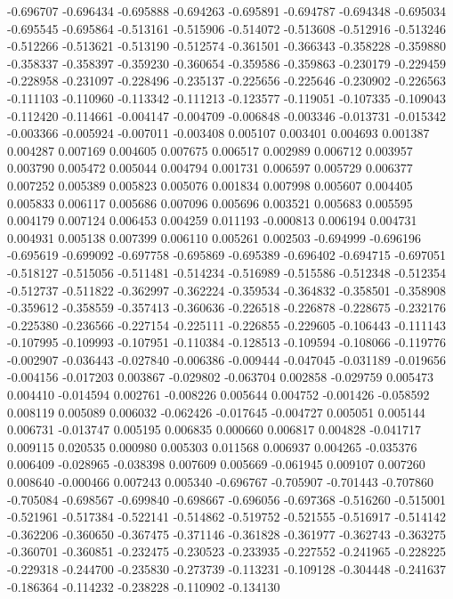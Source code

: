 -0.696707
-0.696434
-0.695888
-0.694263
-0.695891
-0.694787
-0.694348
-0.695034
-0.695545
-0.695864
-0.513161
-0.515906
-0.514072
-0.513608
-0.512916
-0.513246
-0.512266
-0.513621
-0.513190
-0.512574
-0.361501
-0.366343
-0.358228
-0.359880
-0.358337
-0.358397
-0.359230
-0.360654
-0.359586
-0.359863
-0.230179
-0.229459
-0.228958
-0.231097
-0.228496
-0.235137
-0.225656
-0.225646
-0.230902
-0.226563
-0.111103
-0.110960
-0.113342
-0.111213
-0.123577
-0.119051
-0.107335
-0.109043
-0.112420
-0.114661
-0.004147
-0.004709
-0.006848
-0.003346
-0.013731
-0.015342
-0.003366
-0.005924
-0.007011
-0.003408
0.005107
0.003401
0.004693
0.001387
0.004287
0.007169
0.004605
0.007675
0.006517
0.002989
0.006712
0.003957
0.003790
0.005472
0.005044
0.004794
0.001731
0.006597
0.005729
0.006377
0.007252
0.005389
0.005823
0.005076
0.001834
0.007998
0.005607
0.004405
0.005833
0.006117
0.005686
0.007096
0.005696
0.003521
0.005683
0.005595
0.004179
0.007124
0.006453
0.004259
0.011193
-0.000813
0.006194
0.004731
0.004931
0.005138
0.007399
0.006110
0.005261
0.002503
-0.694999
-0.696196
-0.695619
-0.699092
-0.697758
-0.695869
-0.695389
-0.696402
-0.694715
-0.697051
-0.518127
-0.515056
-0.511481
-0.514234
-0.516989
-0.515586
-0.512348
-0.512354
-0.512737
-0.511822
-0.362997
-0.362224
-0.359534
-0.364832
-0.358501
-0.358908
-0.359612
-0.358559
-0.357413
-0.360636
-0.226518
-0.226878
-0.228675
-0.232176
-0.225380
-0.236566
-0.227154
-0.225111
-0.226855
-0.229605
-0.106443
-0.111143
-0.107995
-0.109993
-0.107951
-0.110384
-0.128513
-0.109594
-0.108066
-0.119776
-0.002907
-0.036443
-0.027840
-0.006386
-0.009444
-0.047045
-0.031189
-0.019656
-0.004156
-0.017203
0.003867
-0.029802
-0.063704
0.002858
-0.029759
0.005473
0.004410
-0.014594
0.002761
-0.008226
0.005644
0.004752
-0.001426
-0.058592
0.008119
0.005089
0.006032
-0.062426
-0.017645
-0.004727
0.005051
0.005144
0.006731
-0.013747
0.005195
0.006835
0.000660
0.006817
0.004828
-0.041717
0.009115
0.020535
0.000980
0.005303
0.011568
0.006937
0.004265
-0.035376
0.006409
-0.028965
-0.038398
0.007609
0.005669
-0.061945
0.009107
0.007260
0.008640
-0.000466
0.007243
0.005340
-0.696767
-0.705907
-0.701443
-0.707860
-0.705084
-0.698567
-0.699840
-0.698667
-0.696056
-0.697368
-0.516260
-0.515001
-0.521961
-0.517384
-0.522141
-0.514862
-0.519752
-0.521555
-0.516917
-0.514142
-0.362206
-0.360650
-0.367475
-0.371146
-0.361828
-0.361977
-0.362743
-0.363275
-0.360701
-0.360851
-0.232475
-0.230523
-0.233935
-0.227552
-0.241965
-0.228225
-0.229318
-0.244700
-0.235830
-0.273739
-0.113231
-0.109128
-0.304448
-0.241637
-0.186364
-0.114232
-0.238228
-0.110902
-0.134130
